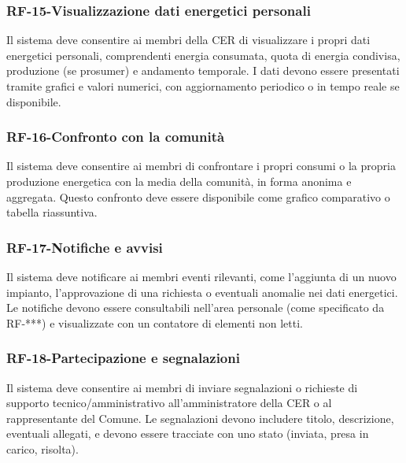 \subsubsection*{RF-15-Visualizzazione dati energetici personali}
Il sistema deve consentire ai membri della CER di visualizzare i propri dati energetici personali, comprendenti energia consumata, quota di energia condivisa, produzione (se prosumer) e andamento temporale. I dati devono essere presentati tramite grafici e valori numerici, con aggiornamento periodico o in tempo reale se disponibile.
\subsubsection*{RF-16-Confronto con la comunità}
Il sistema deve consentire ai membri di confrontare i propri consumi o la propria produzione energetica con la media della comunità, in forma anonima e aggregata. Questo confronto deve essere disponibile come grafico comparativo o tabella riassuntiva.
\subsubsection*{RF-17-Notifiche e avvisi}
Il sistema deve notificare ai membri eventi rilevanti, come l’aggiunta di un nuovo impianto, l’approvazione di una richiesta o eventuali anomalie nei dati energetici. Le notifiche devono essere consultabili nell’area personale (come specificato da RF-***) e visualizzate con un contatore di elementi non letti.
\subsubsection*{RF-18-Partecipazione e segnalazioni}
Il sistema deve consentire ai membri di inviare segnalazioni o richieste di supporto tecnico/amministrativo all’amministratore della CER o al rappresentante del Comune. Le segnalazioni devono includere titolo, descrizione, eventuali allegati, e devono essere tracciate con uno stato (inviata, presa in carico, risolta).